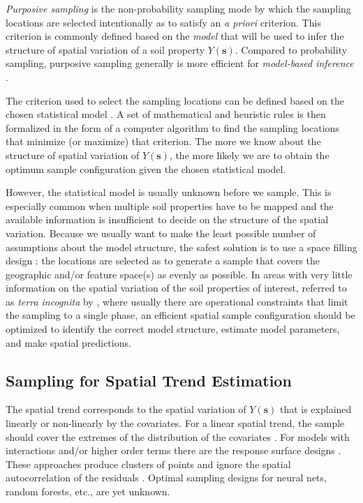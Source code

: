 \emph{Purposive sampling} is the non-probability sampling mode by which the sampling locations are selected 
intentionally as to satisfy an \textit{a priori} criterion. This criterion is commonly defined based on the 
\emph{model} that will be used to infer the structure of spatial variation of a soil property 
$Y(\boldsymbol{s})$. Compared to probability sampling, purposive sampling generally is more efficient for 
\emph{model-based inference} \cite{deGruijterEtAl2006}.

The criterion used to select the sampling locations can be defined based on the chosen statistical model 
\cite{deGruijterEtAl2006, Mueller2007, WebsterEtAl2013}. A set of mathematical and heuristic rules is then 
formalized in the form of a computer algorithm to find the sampling locations that minimize (or maximize) that 
criterion. The more we know about the structure of spatial variation of $Y(\boldsymbol{s})$, the more likely we 
are to obtain the optimum sample configuration given the chosen statistical model.

However, the statistical model is usually unknown before we sample. This is especially common when multiple 
soil properties have to be mapped and the available information is insufficient to decide on the structure of 
the spatial variation. Because we usually want to make the least possible number of assumptions about the model 
structure, the safest solution is to use a space filling design \cite{HenglEtAl2003a, deGruijterEtAl2006, 
Mueller2007, WalvoortEtAl2010}: the locations are selected as to generate a sample that covers the geographic 
and/or feature space(s) as evenly as possible. In areas with very little information on the spatial variation 
of the soil properties of interest, referred to as \emph{terra incognita} by \citet{WebsterEtAl2007}, where 
usually there are operational constraints that limit the sampling to a single phase, an efficient spatial 
sample configuration should be optimized to identify the correct model structure, estimate model parameters, 
and make spatial predictions.

\subsection{Sampling for Spatial Trend Estimation}

The spatial trend corresponds to the spatial variation of $Y(\boldsymbol{s})$ that is explained linearly or 
non-linearly by the covariates. For a linear spatial trend, the sample should cover the extremes of the 
distribution of the covariates \cite{Mueller2007}. For models with interactions and/or higher order terms there 
are the response surface designs \cite{BoxEtAl1951, LeschEtAl1995}. These approaches produce clusters of points 
and ignore the spatial autocorrelation of the residuals \cite{BrusEtAl2007a, Mueller2007}. Optimal sampling 
designs for neural nets, random forests, etc., are yet unknown.

